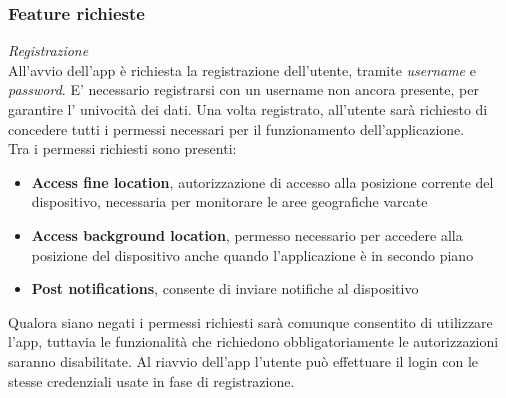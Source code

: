 \documentclass{article}
\begin{document}
\subsubsection*{Feature richieste}
\textit{Registrazione} \vspace*{7pt}\\
All'avvio dell'app è richiesta la registrazione dell'utente, tramite \textit{username} e \textit{password}. E' necessario registrarsi con un username non ancora presente, per garantire l' univocità dei dati. Una volta registrato, all'utente sarà richiesto di concedere tutti i permessi necessari per il funzionamento dell'applicazione.\\
Tra i permessi richiesti sono presenti:
\begin{itemize}
    \renewcommand{\labelitemi}{-}
    \item \textbf{Access fine location}, autorizzazione di accesso alla posizione corrente del dispositivo, necessaria per monitorare le aree geografiche varcate
    \item \textbf{Access background location}, permesso necessario per accedere alla posizione del dispositivo anche quando l'applicazione è in secondo piano
    \item \textbf{Post notifications}, consente di inviare notifiche al dispositivo
\end{itemize}
Qualora siano negati i permessi richiesti sarà comunque consentito di utilizzare l'app, tuttavia le funzionalità che richiedono obbligatoriamente le autorizzazioni saranno disabilitate.
Al riavvio dell'app l'utente può effettuare il login con le stesse credenziali usate in fase di registrazione. \vspace*{7pt}\\
\end{document}
